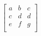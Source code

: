 \documentclass{article}
\begin{document}
$$
\begin{bmatrix} 
a & b & c \\
c & d & d\\
e & f & g \\
\end{bmatrix}
\quad
$$
\end{document}
